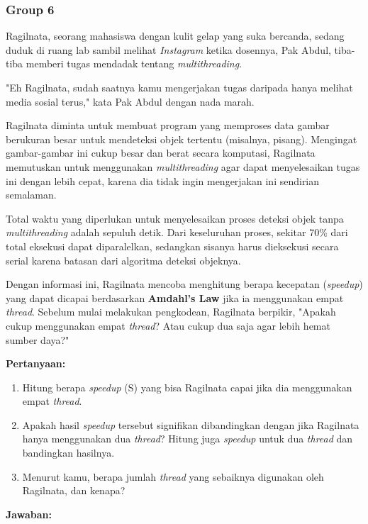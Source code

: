 \documentclass[12pt]{article}
\begin{document}
\subsubsection{Group 6}

Ragilnata, seorang mahasiswa dengan kulit gelap yang suka bercanda, sedang duduk di ruang lab sambil melihat \textit{Instagram} ketika dosennya, Pak Abdul, tiba-tiba memberi tugas mendadak tentang \textit{multithreading}. 

"Eh Ragilnata, sudah saatnya kamu mengerjakan tugas daripada hanya melihat media sosial terus," kata Pak Abdul dengan nada marah.

Ragilnata diminta untuk membuat program yang memproses data gambar berukuran besar untuk mendeteksi objek tertentu (misalnya, pisang). Mengingat gambar-gambar ini cukup besar dan berat secara komputasi, Ragilnata memutuskan untuk menggunakan \textit{multithreading} agar dapat menyelesaikan tugas ini dengan lebih cepat, karena dia tidak ingin mengerjakan ini sendirian semalaman.

Total waktu yang diperlukan untuk menyelesaikan proses deteksi objek tanpa \textit{multithreading} adalah sepuluh detik. Dari keseluruhan proses, sekitar 70\% dari total eksekusi dapat diparalelkan, sedangkan sisanya harus dieksekusi secara serial karena batasan dari algoritma deteksi objeknya.

Dengan informasi ini, Ragilnata mencoba menghitung berapa kecepatan (\textit{speedup}) yang dapat dicapai berdasarkan \textbf{Amdahl’s Law} jika ia menggunakan empat \textit{thread}. Sebelum mulai melakukan pengkodean, Ragilnata berpikir, "Apakah cukup menggunakan empat \textit{thread}? Atau cukup dua saja agar lebih hemat sumber daya?"




\textbf{Pertanyaan:}
\begin{enumerate}
    \item Hitung berapa \textit{speedup} (S) yang bisa Ragilnata capai jika dia menggunakan empat \textit{thread}.
    \item Apakah hasil \textit{speedup} tersebut signifikan dibandingkan dengan jika Ragilnata hanya menggunakan dua \textit{thread}? Hitung juga \textit{speedup} untuk dua \textit{thread} dan bandingkan hasilnya.  
    \item Menurut kamu, berapa jumlah \textit{thread} yang sebaiknya digunakan oleh Ragilnata, dan kenapa?
\end{enumerate}


\textbf{Jawaban:}
\end{document}
